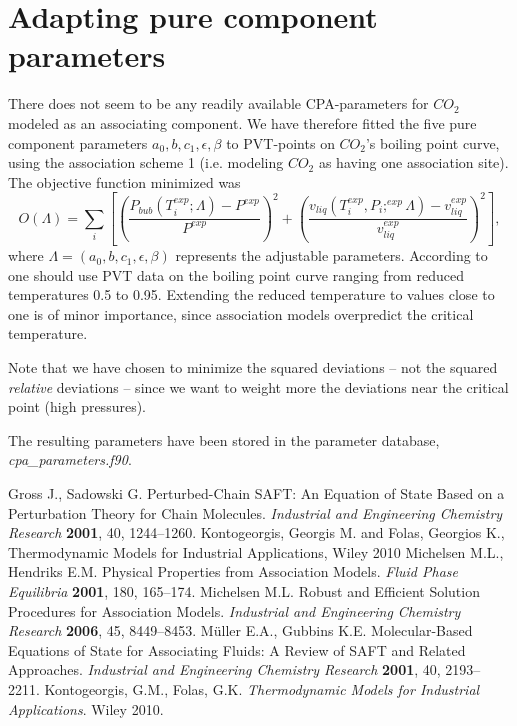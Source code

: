 \documentclass[english]{../thermomemo/thermomemo}
\newcommand{\lp}{\left(}
\newcommand{\rp}{\right)}
\begin{document}
\section{Adapting pure component parameters}
There does not seem to be any readily available CPA-parameters for $CO_2$ modeled as an associating component. We have therefore fitted the five pure component parameters $a_0,b,c_1,\epsilon,\beta$ to PVT-points on $CO_2$'s boiling point curve, using the association scheme 1 (i.e. modeling $CO_2$ as having one association site). The objective function minimized was
$$
O(\Lambda) = \sum_i \left[ \lp \frac{P_{bub}(T_i^{exp};\Lambda)-P^{exp}}{P^{exp}}\rp^2 + \lp \frac{v_{liq}(T_i^{exp},P_i;^{exp}\Lambda)-v_{liq}^{exp}}{v_{liq}^{exp}} \rp^2 \right],
$$
where $\Lambda = (a_0,b,c_1,\epsilon,\beta)$ represents the adjustable parameters. According to \cite{Kontogeorgis10} one should use PVT data on the boiling point curve ranging from reduced temperatures 0.5 to 0.95. Extending the reduced temperature to values close to one is of minor importance, since association models overpredict the critical temperature.

Note that we have chosen to minimize the squared deviations -- not the squared \textit{relative} deviations -- since we want to weight more the deviations near the critical point (high pressures).

The resulting parameters have been stored in the parameter database, \textit{cpa\_parameters.f90}.


\begin{thebibliography}{11}

 Gross J., Sadowski G. Perturbed-Chain SAFT: An Equation of State Based on a Perturbation Theory for Chain Molecules. \textit{Industrial and Engineering Chemistry Research} \textbf{2001}, 40, 1244--1260.
 Kontogeorgis, Georgis M. and Folas, Georgios K., Thermodynamic Models for Industrial Applications, Wiley 2010
 Michelsen M.L., Hendriks E.M. Physical Properties from Association Models. \textit{Fluid Phase Equilibria} \textbf{2001}, 180, 165--174.
 Michelsen M.L. Robust and Efficient Solution Procedures for Association Models. \textit{Industrial and Engineering Chemistry Research} \textbf{2006}, 45, 8449--8453.
 M{\"u}ller E.A., Gubbins K.E. Molecular-Based Equations of State for Associating Fluids: A Review of SAFT and Related Approaches. \textit{Industrial and Engineering Chemistry Research} \textbf{2001}, 40, 2193--2211.
 Kontogeorgis, G.M., Folas, G.K. \textit{Thermodynamic Models for Industrial Applications}. Wiley 2010.

\end{thebibliography}
\end{document}
